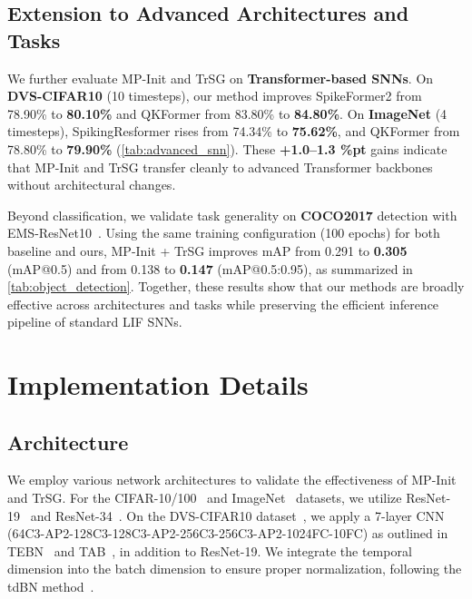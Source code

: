 \subsection{Extension to Advanced Architectures and Tasks}

We further evaluate MP-Init and TrSG on \textbf{Transformer-based SNNs}. 
On \textbf{DVS-CIFAR10} (10 timesteps), our method improves SpikeFormer2 from 78.90\% to \textbf{80.10\%} and QKFormer from 83.80\% to \textbf{84.80\%}. 
On \textbf{ImageNet} (4 timesteps), SpikingResformer rises from 74.34\% to \textbf{75.62\%}, and QKFormer from 78.80\% to \textbf{79.90\%} (\cref{tab:advanced_snn}). 
These \textbf{+1.0–1.3 \%pt} gains indicate that MP-Init and TrSG transfer cleanly to advanced Transformer backbones without architectural changes.

Beyond classification, we validate task generality on \textbf{COCO2017} detection with EMS-ResNet10~\cite{su:2023}. 
Using the same training configuration (100 epochs) for both baseline and ours, MP-Init + TrSG improves mAP from 0.291 to \textbf{0.305} (mAP@0.5) and from 0.138 to \textbf{0.147} (mAP@0.5:0.95), as summarized in \cref{tab:object_detection}. 
Together, these results show that our methods are broadly effective across architectures and tasks while preserving the efficient inference pipeline of standard LIF SNNs.



\section{Implementation Details}
\label{sec:experimental_detail}
\subsection{Architecture}
We employ various network architectures to validate the effectiveness of MP-Init and TrSG. For the CIFAR-10/100~\cite{cifar} and ImageNet~\cite{imagenet} datasets, we utilize ResNet-19~\cite{zheng:2021} and ResNet-34~\cite{resnet}. On the DVS-CIFAR10 dataset~\cite{dvscifar10}, we apply a 7-layer CNN (64C3-AP2-128C3-128C3-AP2-256C3-256C3-AP2-1024FC-10FC) as outlined in TEBN~\cite{tebn:2022} and TAB~\cite{tab:2024}, in addition to ResNet-19. We integrate the temporal dimension into the batch dimension to ensure proper normalization, following the tdBN method~\cite{zheng:2021}.

